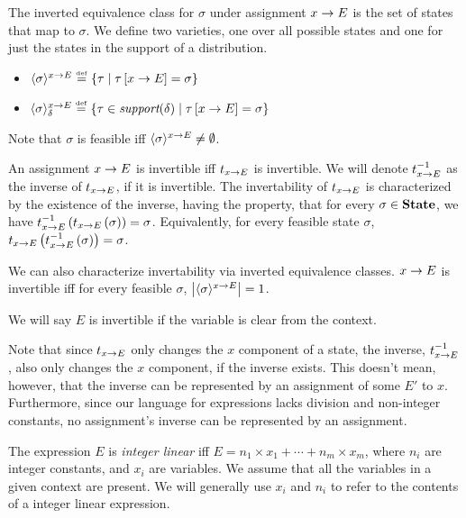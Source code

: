 \begin{definition} The inverted equivalence class for $ \sigma $ under assignment $ x \rightarrow E $
is the set of states that map to $ \sigma $. We define two varieties,
one over all possible states and one for just the states in the
support of a distribution.
\begin{itemize} 
\item{} $ \langle \sigma \rangle^{x \rightarrow E} \stackrel{\smash{\scriptscriptstyle \mathrm{def}}}= \left\{ \tau \;|\; \tau \left[ x \rightarrow E \right]
= \sigma \right\} $
\item{} $ \langle \sigma \rangle^{x \rightarrow E}_\delta
\stackrel{\smash{\scriptscriptstyle \mathrm{def}}}= \left\{ \tau \in \textit{support}(\delta) \;|\; \tau \left[ x \rightarrow E \right]
= \sigma \right\} $
\end{itemize}

\end{definition}

Note that $ \sigma $ is feasible iff $ \langle \sigma \rangle^{x \rightarrow E} \neq \emptyset $.

\begin{definition} An assignment $ x \rightarrow E $ is invertible iff
$ t_{x \rightarrow E} $ is invertible. We will denote
$ t_{x \rightarrow E}^{-1} $ as the inverse of $ t_{x \rightarrow E} $, if it
is invertible. The invertability of $ t_{x \rightarrow E} $ is
characterized by the existence of the inverse, having the property,
that for every $ \sigma \in \textbf{State} $, we have
$ t_{x \rightarrow E}^{-1} \left( t_{x \rightarrow E} \left( \sigma \right) \right) = \sigma
$. Equivalently, for every feasible state $ \sigma $,
$ t_{x \rightarrow E}\left( t_{x \rightarrow E}^{-1}\left( \sigma \right) \right) = \sigma
$.

We can also characterize invertability via inverted equivalence
classes. $ x \rightarrow E $ is invertible iff for every feasible
$ \sigma $, $ \left| \langle \sigma \rangle^{x \rightarrow E} \right| = 1 $.

We will say $ E $ is invertible if the variable is clear from the
context.

\end{definition}

Note that since $ t_{x \rightarrow E} $ only changes the $ x $ component
of a state, the inverse, $ t_{x \rightarrow E}^{-1} $, also only changes
the $ x $ component, if the inverse exists. This doesn't mean,
however, that the inverse can be represented by an assignment of some
$ E' $ to $ x $. Furthermore, since our language for expressions lacks
division and non-integer constants, no assignment's inverse can be
represented by an assignment.

\begin{definition} The expression $ E $ is \emph{integer linear} iff $
E = n_1 \times x_1 + \cdots + n_m \times x_m $, where $ n_i $ are
integer constants, and $ x_i $ are variables. We assume that all the
variables in a given context are present. We will generally use $ x_i
$ and $ n_i $ to refer to the contents of a integer linear expression.
\end{definition}

